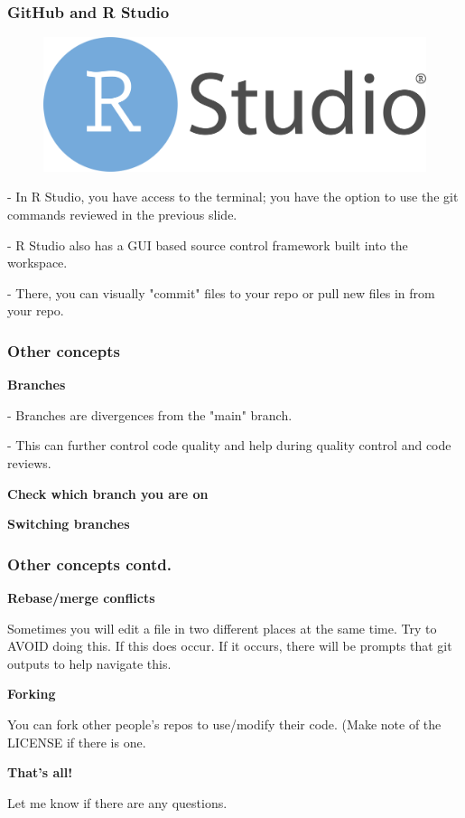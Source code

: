 \documentclass{beamer}
\begin{document}
\begin{frame}
\frametitle{GitHub and R Studio}

\begin{figure}[t]
\includegraphics[scale=0.05]{images/RStudio-Logo-Flat.png}
\end{figure}

- In R Studio, you have access to the terminal; you have the option to use the git commands reviewed in the previous slide. 

- R Studio also has a GUI based source control framework built into the workspace. 

\hspace{10mm} - There, you can visually "commit" files to your repo or pull new files in from your repo.

\end{frame}

\begin{frame}
\frametitle{Other concepts}

\textbf{Branches}

\hspace{10mm} - Branches are divergences from the "main" branch.

\hspace{10mm} - This can further control code quality and help during quality control and code reviews.

\textbf{Check which branch you are on}

\hspace{10mm} 

\textbf{Switching branches}

\hspace{10mm} 

\end{frame}

\begin{frame}
\frametitle{Other concepts contd.}

\textbf{Rebase/merge conflicts}

Sometimes you will edit a file in two different places at the same time. Try to AVOID doing this. If this does occur. If it occurs, there will be prompts that git outputs to help navigate this.

\textbf{Forking}

You can fork other people's repos to use/modify their code. (Make note of the LICENSE if there is one.

\end{frame}

\begin{frame}
\centering
\huge \textbf{That's all!}

\normalsize Let me know if there are any questions.

\end{frame}
\end{document}
